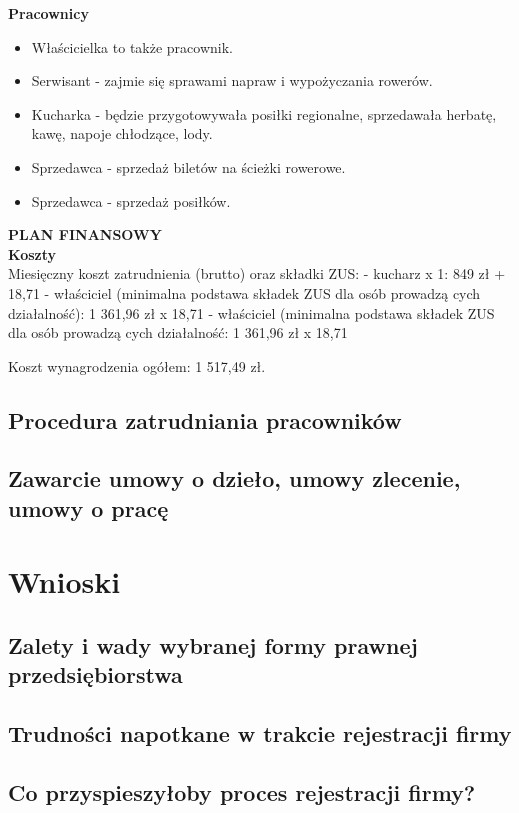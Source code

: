 \documentclass{sprawozdanie-agh}
\begin{document}
		\textbf{Pracownicy}
		\begin{itemize}
		\item Właścicielka to także pracownik.
		\item Serwisant - zajmie się sprawami napraw i wypożyczania rowerów.
		\item Kucharka - będzie przygotowywała posiłki regionalne, sprzedawała herbatę, kawę, napoje chłodzące, lody.
		\item Sprzedawca - sprzedaż biletów na ścieżki rowerowe.
		\item Sprzedawca - sprzedaż posiłków.
		\end{itemize}
	
		\textbf{PLAN FINANSOWY}\\
		\textbf{Koszty}\\
		Miesięczny koszt zatrudnienia (brutto) oraz składki ZUS: 
		- kucharz x 1:
		849 zł + 18,71%
		-	właściciel (minimalna podstawa składek ZUS dla osób prowadzą
		cych działalność):
		1 361,96 zł x 18,71%
		-	właściciel (minimalna podstawa składek ZUS dla osób prowadzą
		cych działalność:
		1 361,96 zł x 18,71%
		
		Koszt wynagrodzenia ogółem:		  1 517,49 zł.
		
		\subsection{Procedura zatrudniania pracowników}
		\subsection{Zawarcie umowy o dzieło, umowy zlecenie, umowy o pracę}

	\section{Wnioski} 

		\subsection{Zalety i wady wybranej formy prawnej przedsiębiorstwa}
		\subsection{Trudności napotkane w trakcie rejestracji firmy}
		\subsection{Co przyspieszyłoby proces rejestracji firmy?}
\end{document}
